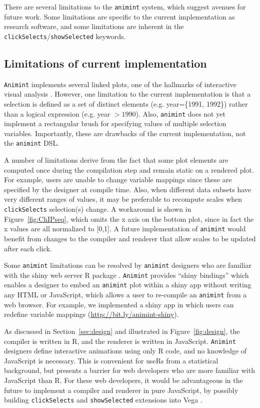 \documentclass[journal]{vgtc}\usepackage[]{graphicx}\usepackage[]{color}
\begin{document}
There are several limitations to the \texttt{animint} system, which suggest
avenues for future work. Some limitations are specific to the current
implementation as research software, and some limitations are inherent
in the \texttt{clickSelects}/\texttt{showSelected} keywords.

\subsection{Limitations of current implementation}

\texttt{Animint} implements several linked plots, one of the hallmarks of
interactive visual analysis \citep{iva}. However, one limitation to
the current implementation is that a selection is defined as a set of
distinct elements (e.g. year=\{1991, 1992\}) rather than a logical
expression (e.g. year $>1990$). Also, \texttt{animint} does not yet
implement a rectangular brush for specifying values of
multiple selection variables.
Importantly, these are drawbacks of the
current implementation, not the \texttt{animint} DSL.

A number of limitations derive from the fact that some plot elements
are computed once during the compilation step and remain static on a
rendered plot. For example, users are unable to change variable
mappings since these are specified by the designer at compile
time. Also, when different data subsets have very different ranges of
values, it may be preferable to recompute scales when
\texttt{clickSelects} selection(s) change. A workaround is shown in
Figure~\ref{fig:ChIPseq}, which omits the x axis on the bottom plot,
since in fact the x values are all normalized to [0,1]. A future
implementation of \texttt{animint} would benefit from changes to the compiler
and renderer that allow scales to be updated after each click.

Some \texttt{animint} limitations can be resolved by \texttt{animint} designers who are
familiar with the shiny web server R package \citep{shiny}.  \texttt{Animint}
provides ``shiny bindings'' which enables a designer to embed an
\texttt{animint} plot within a shiny app without writing any HTML or
JavaScript, which allows a user to re-compile an \texttt{animint} from a web
browser. For example, we implemented a shiny app in which users can
redefine variable mappings (\url{http://bit.ly/animint-shiny}).

As discussed in Section~\ref{sec:design} and illustrated in
Figure~\ref{fig:design}, the compiler is written in R, and the
renderer is written in JavaScript.
\texttt{Animint} designers define interactive animations using only R code, and
no knowledge of JavaScript is necessary. This is convenient for useRs
from a statistical background, but presents a barrier for web
developers who are more familiar with JavaScript than R. For these web
developers, it would be advantageous in the future to implement a
compiler and renderer in pure JavaScript, by possibly building
\texttt{clickSelects} and \texttt{showSelected} extensions into Vega
\citep{vega}.
\end{document}
